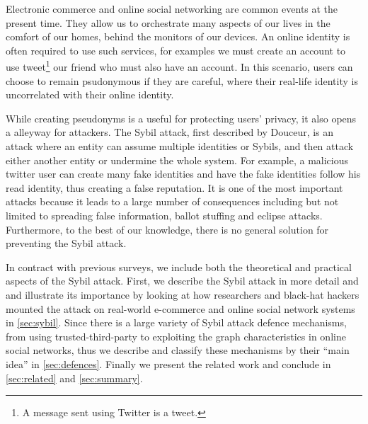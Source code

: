Electronic commerce and online social networking are common events at the
present time. They allow us to orchestrate many aspects of our lives in the
comfort of our homes, behind the monitors of our devices. An online identity is
often required to use such services, for examples we must create an account to
use tweet\footnote{A message sent using Twitter is a tweet.} our friend who must
also have an account. In this scenario, users can choose to remain psudonymous
if they are careful, where their real-life identity is uncorrelated with their
online identity. %

While creating pseudonyms is a useful for protecting users' privacy, it also
opens a alleyway for attackers. The Sybil attack, first described by
Douceur\cite{douceur2002sybil}, is an attack where an entity can assume multiple
identities or Sybils, and then attack either another entity or undermine the
whole system. For example, a malicious twitter user can create many fake
identities and have the fake identities follow his read identity, thus creating
a false reputation. It is one of the most important attacks because it leads to
a large number of consequences including but not limited to spreading false
information, ballot stuffing\cite{bhattacharjee2005avoiding} and eclipse
attacks\cite{singh2006eclipse}. Furthermore, to the best of our knowledge, there
is no general solution for preventing the Sybil attack.

In contract with previous surveys, we include both the theoretical and practical
aspects of the Sybil attack. First, we describe the Sybil attack in more detail
and and illustrate its importance by looking at how researchers and black-hat
hackers mounted the attack on real-world e-commerce and online social network
systems in \autoref{sec:sybil}. Since there is a large variety of Sybil attack
defence mechanisms, from using trusted-third-party to exploiting the graph
characteristics in online social networks, thus we describe and classify these
mechanisms by their ``main idea'' in \autoref{sec:defences}. Finally we present
the related work and conclude in \autoref{sec:related} and \autoref{sec:summary}.

